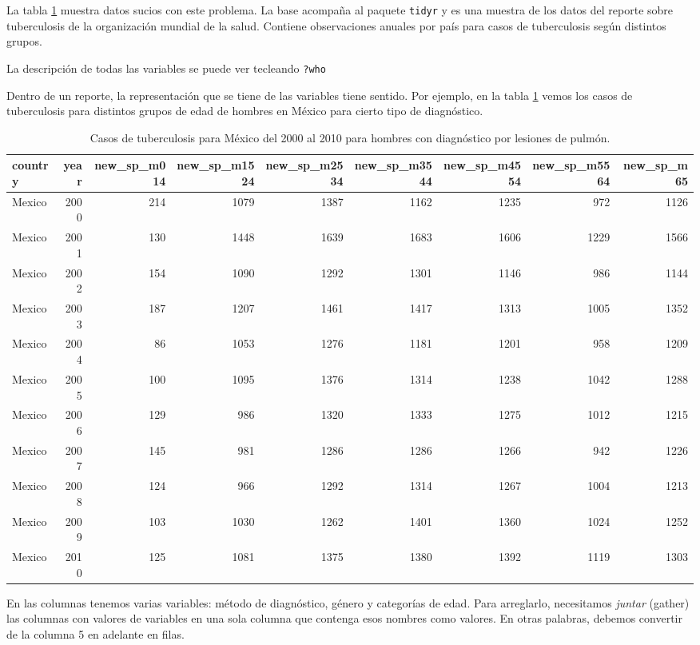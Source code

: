\documentclass[]{article}
\begin{document}
La tabla \ref{tab:varsencols} muestra datos sucios con este problema. La
base acompaña al paquete \texttt{tidyr} \parencite{tidyr} y es una
muestra de los datos del reporte sobre tuberculosis de la organización
mundial de la salud. Contiene observaciones anuales por país para casos
de tuberculosis según distintos grupos.

La descripción de todas las variables se puede ver tecleando
\texttt{?who}

Dentro de un reporte, la representación que se tiene de las variables
tiene sentido. Por ejemplo, en la tabla \ref{tab:varsencols} vemos los
casos de tuberculosis para distintos grupos de edad de hombres en México
para cierto tipo de diagnóstico.

\begin{table}[H]
\centering
\begingroup\tiny
\begin{tabular}{lrrrrrrrr}
  \hline
country & year & new\_sp\_m014 & new\_sp\_m1524 & new\_sp\_m2534 & new\_sp\_m3544 & new\_sp\_m4554 & new\_sp\_m5564 & new\_sp\_m65 \\ 
  \hline
Mexico & 2000 & 214 & 1079 & 1387 & 1162 & 1235 & 972 & 1126 \\ 
  Mexico & 2001 & 130 & 1448 & 1639 & 1683 & 1606 & 1229 & 1566 \\ 
  Mexico & 2002 & 154 & 1090 & 1292 & 1301 & 1146 & 986 & 1144 \\ 
  Mexico & 2003 & 187 & 1207 & 1461 & 1417 & 1313 & 1005 & 1352 \\ 
  Mexico & 2004 &  86 & 1053 & 1276 & 1181 & 1201 & 958 & 1209 \\ 
  Mexico & 2005 & 100 & 1095 & 1376 & 1314 & 1238 & 1042 & 1288 \\ 
  Mexico & 2006 & 129 & 986 & 1320 & 1333 & 1275 & 1012 & 1215 \\ 
  Mexico & 2007 & 145 & 981 & 1286 & 1286 & 1266 & 942 & 1226 \\ 
  Mexico & 2008 & 124 & 966 & 1292 & 1314 & 1267 & 1004 & 1213 \\ 
  Mexico & 2009 & 103 & 1030 & 1262 & 1401 & 1360 & 1024 & 1252 \\ 
  Mexico & 2010 & 125 & 1081 & 1375 & 1380 & 1392 & 1119 & 1303 \\ 
   \hline
\end{tabular}
\endgroup
\caption{Casos de tuberculosis para México del 2000 al 2010 para hombres con diagnóstico por lesiones de pulmón.} 
\label{tab:varsencols}
\end{table}

En las columnas tenemos varias variables: método de diagnóstico, género
y categorías de edad. Para arreglarlo, necesitamos \emph{juntar}
(gather) las columnas con valores de variables en una sola columna que
contenga esos nombres como valores. En otras palabras, debemos convertir
de la columna 5 en adelante en filas.
\end{document}
